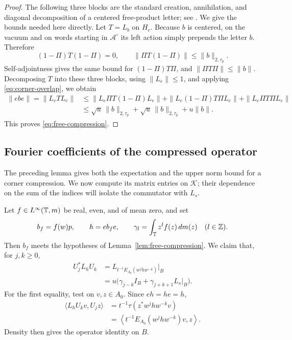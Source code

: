 \begin{proof}
The following three blocks are the standard creation, annihilation,
and diagonal decomposition of a centered free-product letter; see
\citet[Section~1, Lemmas~2.1--2.3 and Corollary~2.4]{RicardXu2006}.
We give the bounds needed here directly.
Let $T=L_b$ on $H_c$. Because $b$ is centered, on the vacuum and on
words starting in $\mathcal A^\circ$ its left action simply prepends
the letter $b$. Therefore
\[
  (1-\Pi)T(1-\Pi)=0,\qquad
  \|\Pi T(1-\Pi)\|\le\|b\|_{2,\tau_p}.
\]
Self-adjointness gives the same bound for $(1-\Pi)T\Pi$, and
$\|\Pi T\Pi\|\le\|b\|$. Decomposing $T$ into these three blocks,
using $\|L_e\|\le1$, and applying \eqref{eq:corner-overlap}, we obtain
\begin{align*}
  \|ebe\|=\|L_eTL_e\|
   &\le\|L_e\Pi T(1-\Pi)L_e\|
      +\|L_e(1-\Pi)T\Pi L_e\|
      +\|L_e\Pi T\Pi L_e\|\\
   &\le\sqrt u\,\|b\|_{2,\tau_p}
      +\sqrt u\,\|b\|_{2,\tau_p}+u\|b\|.
\end{align*}
This proves \eqref{eq:free-compression}.
\end{proof}

\subsection{Fourier coefficients of the compressed operator}

The preceding lemma gives both the expectation and the upper norm
bound for a corner compression. We now compute its matrix entries on
$\mathcal K$; their dependence on the sum of the indices will isolate
the commutator with $L_s$.

Let $f\in L^\infty(\mathbb T,m)$ be real, even, and of mean zero, and set
\[
  b_f=f(w)p,\qquad h=eb_fe,\qquad
  \gamma_l=\int_{\mathbb T}z^lf(z)\,dm(z)\quad(l\in\mathbb Z).
\]
Then $b_f$ meets the hypotheses of Lemma~\ref{lem:free-compression}.
We claim that, for $j,k\ge0$,
\begin{equation}
  \begin{aligned}
    U_j^*L_hU_k
      &=L_{t^{-1}E_{A_0}(w^jhw^{-k})}\big|_B\\
      &=u\big(\gamma_{j-k}I_B+\gamma_{j+k+1}L_s|_B\big).
  \end{aligned}
  \label{eq:hankel-compression}
\end{equation}
For the first equality, test on $v,z\in A_0$. Since $eh=he=h$,
\begin{align*}
  \langle L_hU_kv,U_jz\rangle
    &=t^{-1}\tau(z^*w^jhw^{-k}v)\\
    &=\left\langle
        t^{-1}E_{A_0}(w^jhw^{-k})v,z\right\rangle.
\end{align*}
Density then gives the operator identity on $B$.

